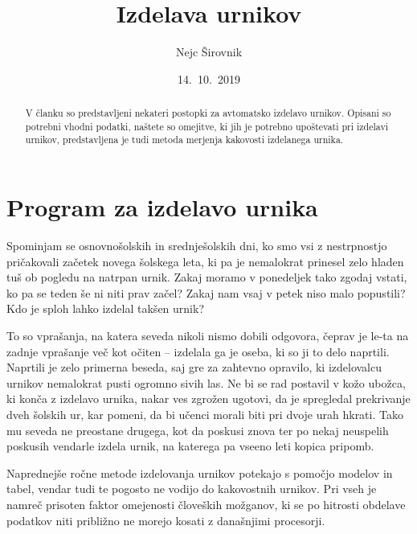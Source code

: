 \documentclass[a4paper,10pt]{article}
\begin{document}

\title{Izdelava urnikov}
\author{Nejc Širovnik}
\date{14.\ 10.\ 2019}
\maketitle

\begin{abstract}
V članku so predstavljeni nekateri postopki za avtomatsko izdelavo urnikov. Opisani so
potrebni vhodni podatki, naštete so omejitve, ki jih je potrebno upoštevati pri izdelavi
urnikov, predstavljena je tudi metoda merjenja kakovosti izdelanega urnika.
\end{abstract}

\section{Program za izdelavo urnika} %

Spominjam se osnovnošolskih in srednješolskih dni, ko smo vsi z nestrpnostjo pričakovali
začetek novega šolskega leta, ki pa je nemalokrat prinesel zelo hladen tuš ob pogledu na
natrpan urnik. Zakaj moramo v ponedeljek tako zgodaj vstati, ko pa se teden še ni niti
prav začel? Zakaj nam vsaj v petek niso malo popustili? Kdo je sploh lahko izdelal
takšen urnik?

To so vprašanja, na katera seveda nikoli nismo dobili odgovora, čeprav je le-ta na zadnje
vprašanje več kot očiten -- izdelala ga je oseba, ki so ji to delo naprtili. Naprtili je
zelo primerna beseda, saj gre za zahtevno opravilo, ki izdelovalcu urnikov nemalokrat
pusti ogromno sivih las. Ne bi se rad postavil v kožo ubožca, ki konča z izdelavo urnika,
nakar ves zgrožen ugotovi, da je spregledal prekrivanje dveh šolskih ur, kar pomeni, da
bi učenci morali biti pri dvoje urah hkrati. Tako mu seveda ne preostane drugega, kot da
poskusi znova ter po nekaj neuspelih poskusih vendarle izdela urnik, na katerega pa vseeno
leti kopica pripomb.

Naprednejše ročne metode izdelovanja urnikov potekajo s pomočjo modelov in tabel, vendar
tudi te pogosto ne vodijo do kakovostnih urnikov. Pri vseh je namreč prisoten faktor
omejenosti človeških možganov, ki se po hitrosti obdelave podatkov niti približno ne
morejo kosati z današnjimi procesorji.
\end{document}
